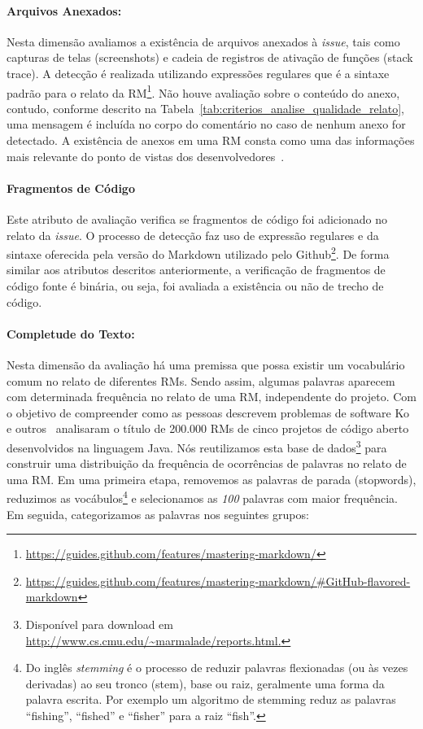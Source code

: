 \paragraph{Arquivos Anexados:}
\label{par:arquivos_anexados}

Nesta dimensão avaliamos a existência de arquivos anexados à \textit{issue},
tais como capturas de telas (screenshots) e cadeia de registros de ativação de
funções (stack trace). A detecção é realizada utilizando expressões regulares
que é a sintaxe padrão para o relato da
RM\footnote{\url{https://guides.github.com/features/mastering-markdown/}}. Não
houve avaliação sobre o conteúdo do anexo, contudo, conforme descrito na
Tabela~\ref{tab:criterios_analise_qualidade_relato}, uma mensagem é incluída no
corpo do comentário no caso de nenhum anexo for detectado. A existência de
anexos em uma RM consta como uma das informações mais relevante do ponto de
vistas dos desenvolvedores~\cite{bettenburg2008makes}.

\paragraph{Fragmentos de Código}
\label{par:fragmentos_de_código}

Este atributo de avaliação verifica se fragmentos de código foi adicionado no
relato da \textit{issue}. O processo de detecção faz uso de expressão regulares
e da sintaxe oferecida pela versão do Markdown utilizado pelo
Github\footnote{\url{https://guides.github.com/features/mastering-markdown/\#GitHub-flavored-markdown}}.
De forma similar aos atributos descritos anteriormente, a verificação de
fragmentos de código fonte é binária, ou seja, foi avaliada a existência ou não
de trecho de código.

\paragraph{Completude do Texto:}
\label{par:completude_de_palavras_chaves}

Nesta dimensão da avaliação há uma premissa que possa existir um vocabulário
comum no relato de diferentes RMs. Sendo assim, algumas palavras aparecem
com determinada frequência no relato de uma RM, independente do projeto. Com o
objetivo de compreender como as pessoas descrevem problemas de software Ko e
outros~\cite{ko2006linguistic} analisaram o título de 200.000 RMs de cinco
projetos de código aberto desenvolvidos na linguagem Java. Nós reutilizamos esta
base de dados\footnote{Disponível para download em
    \url{http://www.cs.cmu.edu/~marmalade/reports.html.}} para construir uma
distribuição da frequência de ocorrências de palavras no relato de uma RM\@.  Em
uma primeira etapa, removemos as palavras de parada (stopwords), reduzimos as
vocábulos\footnote{Do inglês \textit{stemming} é o processo de reduzir palavras
    flexionadas (ou às vezes derivadas) ao seu tronco (stem), base ou raiz,
    geralmente uma forma da palavra escrita. Por exemplo um algoritmo de
    stemming reduz as palavras ``fishing'', ``fished'' e ``fisher'' para a raiz
    ``fish''.} e selecionamos as \textit{100} palavras com maior frequência. Em
seguida, categorizamos as palavras nos seguintes grupos:

